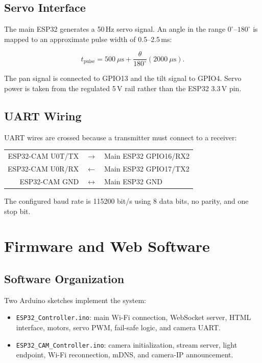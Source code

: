 \documentclass[12pt,a4paper,oneside]{report}
\newcommand{\code}[1]{\texttt{#1}}
\begin{document}
\section{Servo Interface}
The main ESP32 generates a 50\,Hz servo signal. An angle in the range
$0^\circ$--$180^\circ$ is mapped to an approximate pulse width of
0.5--2.5\,ms:

\begin{equation}
  t_{\text{pulse}} =
  500~\mu\text{s} +
  \frac{\theta}{180^\circ}\left(2000~\mu\text{s}\right).
\end{equation}

The pan signal is connected to GPIO13 and the tilt signal to GPIO4. Servo power
is taken from the regulated 5\,V rail rather than the ESP32 3.3\,V pin.

\section{UART Wiring}
UART wires are crossed because a transmitter must connect to a receiver:

\begin{center}
\begin{tabular}{rcl}
  ESP32-CAM U0T/TX & $\longrightarrow$ & Main ESP32 GPIO16/RX2 \\
  ESP32-CAM U0R/RX & $\longleftarrow$ & Main ESP32 GPIO17/TX2 \\
  ESP32-CAM GND & $\longleftrightarrow$ & Main ESP32 GND
\end{tabular}
\end{center}

The configured baud rate is 115200 bit/s using 8 data bits, no parity, and one
stop bit.

\chapter{Firmware and Web Software}
\label{ch:software}

\section{Software Organization}
Two Arduino sketches implement the system:

\begin{itemize}
  \item \code{ESP32\_Controller.ino}: main Wi-Fi connection, WebSocket server,
        HTML interface, motors, servo PWM, fail-safe logic, and camera UART.
  \item \code{ESP32\_CAM\_Controller.ino}: camera initialization, stream server,
        light endpoint, Wi-Fi reconnection, mDNS, and camera-IP announcement.
\end{itemize}
\end{document}
